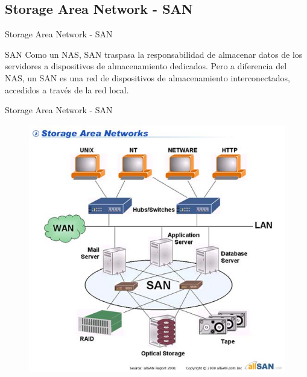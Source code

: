 \documentclass[10pt]{beamer}
\begin{document}
\subsection{Storage Area Network - SAN}

\begin{frame}{Storage Area Network - SAN}
\begin{alertblock}{SAN}
Como un NAS, SAN traspasa la responsabilidad de almacenar datos de los servidores a dispositivos de almacenamiento dedicados. Pero a diferencia del NAS, un SAN es una red de dispositivos de almacenamiento interconectados, accedidos a través de la red local.
\end{alertblock}
\end{frame}

\begin{frame}{Storage Area Network - SAN}
\begin{figure}[h]
\center
\includegraphics[scale=0.4]{san.jpg}
\end{figure}
\end{frame}
\end{document}
